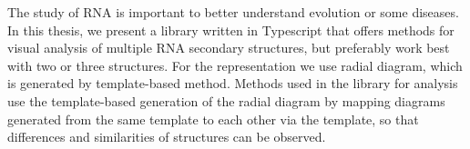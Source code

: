 \documentclass[12pt]{report}
\begin{document}
The study of RNA is important to better understand evolution or some
diseases. In this thesis, we present a library written in Typescript that
offers methods for visual analysis of multiple RNA secondary structures, but
preferably work best with two or three structures. For the representation we
use radial diagram, which is generated by template-based method. Methods used
in the library for analysis use the template-based generation of the radial
diagram by mapping diagrams generated from the same template to each other via
the template, so that differences and similarities of structures can be
observed.
\end{document}

